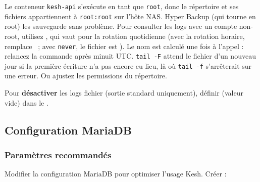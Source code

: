 \documentclass[a4paper,11pt,oneside]{article}
\begin{document}
\begin{keshwarning}
Le conteneur \texttt{kesh-api} s'exécute en tant que \texttt{root}, donc le répertoire  et ses fichiers appartiennent à \texttt{root:root} sur l'hôte NAS. Hyper Backup (qui tourne en root) les sauvegarde sans problème. Pour consulter les logs avec un compte non-root, utilisez , qui vaut pour la rotation quotidienne (avec la rotation horaire,  remplace ~; avec \texttt{never}, le fichier est ). Le nom est calculé une fois à l'appel : relancez la commande après minuit UTC. \texttt{tail -F} attend le fichier d'un nouveau jour si la première écriture n'a pas encore eu lieu, là où \texttt{tail -f} s'arrêterait sur une erreur. Ou ajustez les permissions du répertoire.
\end{keshwarning}

Pour \textbf{désactiver} les logs fichier (sortie standard uniquement), définir  (valeur vide) dans le .

\subsection{Configuration MariaDB}

\subsubsection{Paramètres recommandés}

Modifier la configuration MariaDB pour optimiser l'usage Kesh. Créer  :
\end{document}
